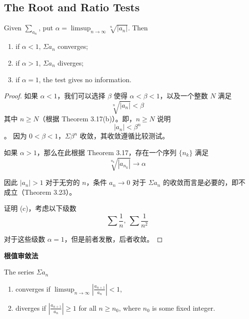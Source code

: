 \documentclass[../poma-notes.tex]{subfiles}
\begin{document}
\subsection*{The Root and Ratio Tests}

\begin{theorem}
  Given $\sum_{a_n}$, put $\alpha = \limsup_{n \to \infty} \sqrt[n]{|a_n|}$.
  Then
  \begin{enumerate}[label=(\alph*)]
    \item if $\alpha < 1$, $\Sigma a_n$ converges;
    \item if $\alpha > 1$, $\Sigma a_n$ diverges;
    \item if $\alpha = 1$, the test gives no information.
  \end{enumerate}
\end{theorem}

\begin{proof}
  如果 $\alpha < 1$，我们可以选择 $\beta$ 使得 $\alpha < \beta < 1$，以及一个整数 $N$ 满足
  \[ \sqrt[n]{|a_n|} < \beta \]
  其中 $n \ge N$（根据 Theorem 3.17(b)）。即，$n \ge N$ 说明
  \[ |a_n| < \beta^n \]。
  因为 $0 < \beta < 1$，$\Sigma \beta^n$ 收敛，其收敛遵循比较测试。

  如果 $\alpha > 1$，那么在此根据 Theorem 3.17，存在一个序列 $\{n_k\}$ 满足
  \[ \sqrt[n_k]{|a_{n_k}|} \to \alpha \]

  因此 $|a_n| > 1$ 对于无穷的 $n$，条件 $a_n \to 0$ 对于 $\Sigma a_n$ 的收敛而言是必要的，即不成立（Theorem 3.23）。

  证明 (c)，考虑以下级数
  \[
    \sum \frac{1}{n}, \ \sum \frac{1}{n^2}
  \]

  对于这些级数 $\alpha = 1$，但是前者发散，后者收敛。
\end{proof}

\begin{anote}
  \textbf{根值审敛法}
\end{anote}

\begin{theorem}
  The series $\Sigma a_n$
  \begin{enumerate}[label=(\alph*)]
    \item converges if $\limsup_{n \to \infty} |\frac{a_{n+1}}{a_n}| < 1$,
    \item diverges if $|\frac{a_{n+1}}{a_n}| \ge 1$ for all $n \ge n_0$, where $n_0$ is some fixed integer.
  \end{enumerate}
\end{theorem}
\end{document}
